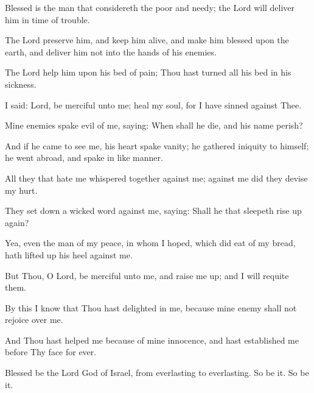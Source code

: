 Blessed is the man that considereth the poor and needy; the Lord will deliver him in time of trouble.

The Lord preserve him, and keep him alive, and make him blessed upon the earth, and deliver him not into the hands of his enemies.

The Lord help him upon his bed of pain; Thou hast turned all his bed in his sickness.

I said: Lord, be merciful unto me; heal my soul, for I have sinned against Thee.

Mine enemies spake evil of me, saying: When shall he die, and his name perish?

And if he came to see me, his heart spake vanity; he gathered iniquity to himself; he went abroad, and spake in like manner.

All they that hate me whispered together against me; against me did they devise my hurt.

They set down a wicked word against me, saying: Shall he that sleepeth rise up again?

Yea, even the man of my peace, in whom I hoped, which did eat of my bread, hath lifted up his heel against me.

But Thou, O Lord, be merciful unto me, and raise me up; and I will requite them.

By this I know that Thou hast delighted in me, because mine enemy shall not rejoice over me.

And Thou hast helped me because of mine innocence, and hast established me before Thy face for ever.

Blessed be the Lord God of Israel, from everlasting to everlasting. So be it. So be it.
